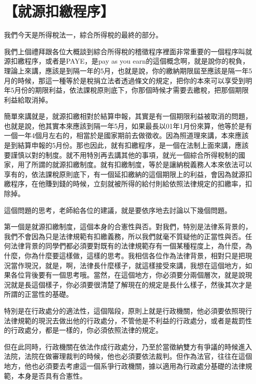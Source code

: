 \documentclass[]{ctexbook}
\begin{document}
\hypertarget{ux5c31ux6e90ux6263ux7e73ux7a0bux5e8f-1}{%
\section{【就源扣繳程序】}\label{ux5c31ux6e90ux6263ux7e73ux7a0bux5e8f-1}}

我們今天是所得稅法一，綜合所得稅的最終的部分。

我們上個禮拜跟各位大概談到綜合所得稅的稽徵程序裡面非常重要的一個程序叫就源扣繳程序，或者是PAYE，是pay as you earn的這個概念啊，就是說你的稅負，理論上來講，應該是到隔一年的5月，也就是說，你的繳納期限屆至應該是隔一年5月的時候，那這一種等於是稅捐立法者透過條文的規定，把你的本來可以享受到明年5月份的期限利益，依法課稅原則底下，你那個時候才需要去繳稅，把那個期限利益給取消掉。

簡單來講就是，就源扣繳相對於結算申報，其實是有一個期限利益被取消的問題，也就是說，他其實本來應該到隔一年5月，如果最長以01年1月份來算，他等於是有一個一年4個月左右的，相當於是國家期前去做徵收。因為照道理來講，本來應該是到結算申報的5月份。那也因此，就有扣繳程序，是一個在法制上面來講，應該要謹慎以對的制度。就不用特別再去講其他的事項，就光一個綜合所得稅制的國家，用了所謂的就源扣繳制度。就有扣繳制度，等於是讓納稅義務人本來依法可以享有的，依法課稅原則底下，有一個延扣繳納的這個期限上的利益，會因為就源扣繳程序，在他賺到錢的時候，立刻就被所得的給付則給依照法律規定的扣繳率，扣除掉。

這個問題的思考，老師給各位的建議，就是要依序地去討論以下幾個問題。

第一個是就源扣繳制度，這個本身的合憲性與否。對我們，特別是法律系背景的，我們不會因為只是法律規範有扣繳義務，所以我們就毫不質疑他的正當性與否。任何法律背景的同學們都必須要對既有的法律規範存有一個某種程度上，為什麼，為什麼，你為什麼要這樣做，這樣的思考。我相信各位作為法律背景，相對只是把現況當作現況，就是，啊，法律長什麼樣子，就這樣接受來講，我想在這個地方，如果各位背後要有一個思考哦。當然，在這個地方，你必須要分兩個層次，就是說現況就是長這個樣子，你必須要很清楚了解現在的規定是長什么樣子，然後其次才是所謂的正當性的基礎。

特別是在行政處分的適法性，這個階段，原則上就是行政機關，他必須要依照現行法律規範的現況去做出他的行政處分，不管他是不利益的行政處分，或者是裁罰性的行政處分，都是一樣的，你必須依照法律的規定。

但在此同時，行政機關在依法作成行政處分，乃至於當徵納雙方有爭議的時候進入法院，法院在做審理裁判的時候，他也必須要依法裁判。但作為法官，往往在這個地方，他也必須要去考慮這一個系爭行政機關，據以適用為行政處分基礎的法律規範，本身是否具有合憲性。
\end{document}
